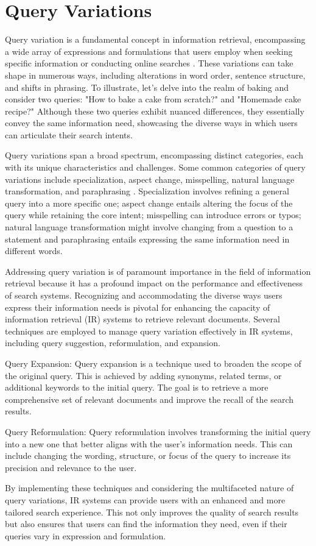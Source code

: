 \section{Query Variations}
Query variation is a fundamental concept in information retrieval, encompassing a wide array of expressions and formulations that users employ when seeking specific information or conducting online searches \cite{zendel}. These variations can take shape in numerous ways, including alterations in word order, sentence structure, and shifts in phrasing. To illustrate, let's delve into the realm of baking and consider two queries: "How to bake a cake from scratch?" and "Homemade cake recipe?" Although these two queries exhibit nuanced differences, they essentially convey the same information need, showcasing the diverse ways in which users can articulate their search intents.

Query variations span a broad spectrum, encompassing distinct categories, each with its unique characteristics and challenges. Some common categories of query variations include specialization, aspect change, misspelling, natural language transformation, and paraphrasing \cite{penha2022}. Specialization involves refining a general query into a more specific one; aspect change entails altering the focus of the query while retaining the core intent; misspelling can introduce errors or typos; natural language transformation might involve changing from a question to a statement and paraphrasing entails expressing the same information need in different words.

Addressing query variation is of paramount importance in the field of information retrieval because it has a profound impact on the performance and effectiveness of search systems. Recognizing and accommodating the diverse ways users express their information needs is pivotal for enhancing the capacity of information retrieval (IR) systems to retrieve relevant documents. Several techniques are employed to manage query variation effectively in IR systems, including query suggestion, reformulation, and expansion.

Query Expansion: Query expansion is a technique used to broaden the scope of the original query. This is achieved by adding synonyms, related terms, or additional keywords to the initial query. The goal is to retrieve a more comprehensive set of relevant documents and improve the recall of the search results.

Query Reformulation: Query reformulation involves transforming the initial query into a new one that better aligns with the user's information needs. This can include changing the wording, structure, or focus of the query to increase its precision and relevance to the user.

By implementing these techniques and considering the multifaceted nature of query variations, IR systems can provide users with an enhanced and more tailored search experience. This not only improves the quality of search results but also ensures that users can find the information they need, even if their queries vary in expression and formulation.